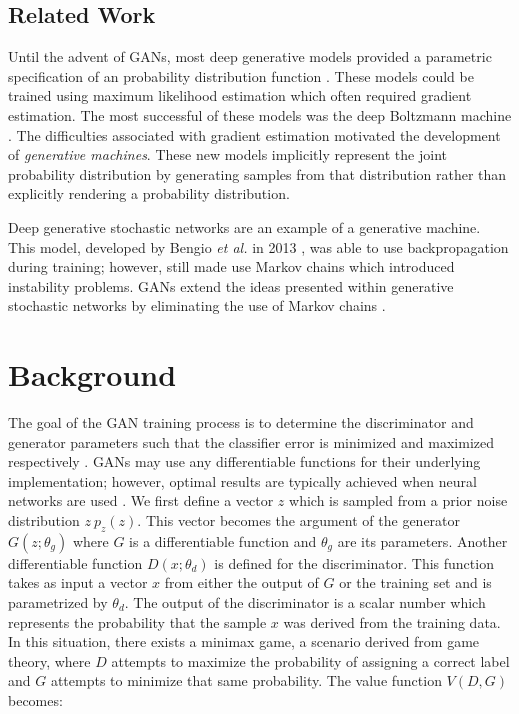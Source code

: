 \documentclass[11pt]{article}
\begin{document}
\subsection{Related Work}
Until the advent of GANs, most deep generative models provided a parametric specification of an probability distribution function \citep{2014arXiv1406.2661G}. These models could be trained using maximum likelihood estimation which often required gradient estimation. The most successful of these models was the deep Boltzmann machine \citep{2014arXiv1406.2661G}. The difficulties associated with gradient estimation motivated the development of \textit{generative machines}. These new models implicitly represent the joint probability distribution by generating samples from that distribution rather than explicitly rendering a probability distribution.

Deep generative stochastic networks are an example of a generative machine. This model, developed by Bengio \textit{et al.} in 2013 \citep{2013arXiv1306.1091B}, was able to use backpropagation during training; however, still made use Markov chains which introduced instability problems. GANs extend the ideas presented within generative stochastic networks by eliminating the use of Markov chains \citep{2014arXiv1406.2661G}.



\section{Background}
The goal of the GAN training process is to determine the discriminator and generator parameters such that the classifier error is minimized and maximized respectively \citep{2017arXiv171007035C}. GANs may use any differentiable functions for their underlying implementation; however, optimal results are typically achieved when neural networks are used \citep{2014arXiv1406.2661G}. We first define a vector $z$ which is sampled from a prior noise distribution $z~p_z(z)$. This vector becomes the argument of the generator $G(z;\theta_g)$ where $G$ is a differentiable function and $\theta_g$ are its parameters. Another differentiable function $D(x;\theta_d)$ is defined for the discriminator. This function takes as input a vector $x$ from either the output of $G$ or the training set and is parametrized by $\theta_d$. The output of the discriminator is a scalar number which represents the probability that the sample $x$ was derived from the training data. In this situation, there exists a minimax game, a scenario derived from game theory, where $D$ attempts to maximize the probability of assigning a correct label and $G$ attempts to minimize that same probability. The value function $V(D,G)$ becomes:
\end{document}
